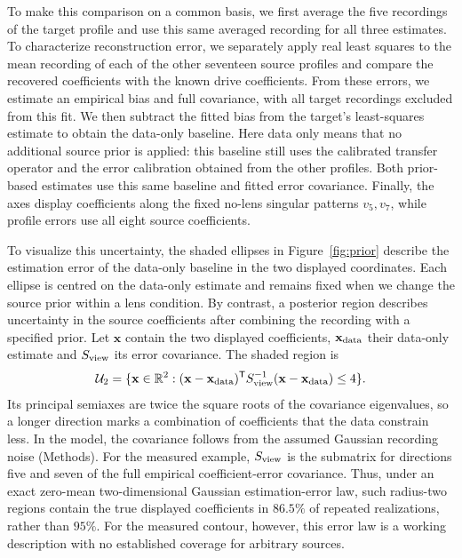 \documentclass[lineno,pdflatex,sn-nature]{sn-jnl}%
\theoremstyle{thmstyleone}%
\theoremstyle{thmstyletwo}%
\theoremstyle{thmstylethree}%
\begin{document}
To make this comparison on a common basis, we first average the five recordings of the target profile and use this same averaged recording for all three estimates. To characterize reconstruction error, we separately apply real least squares to the mean recording of each of the other seventeen source profiles and compare the recovered coefficients with the known drive coefficients. From these errors, we estimate an empirical bias and full covariance, with all target recordings excluded from this fit. We then subtract the fitted bias from the target's least-squares estimate to obtain the data-only baseline. Here data only means that no additional source prior is applied: this baseline still uses the calibrated transfer operator and the error calibration obtained from the other profiles. Both prior-based estimates use this same baseline and fitted error covariance. Finally, the axes display coefficients along the fixed no-lens singular patterns $v_5,v_7$, while profile errors use all eight source coefficients.


\begin{samepage}
To visualize this uncertainty, the shaded ellipses in Figure~\ref{fig:prior} describe the estimation error of the data-only baseline in the two displayed coordinates. Each ellipse is centred on the data-only estimate and remains fixed when we change the source prior within a lens condition. By contrast, a posterior region describes uncertainty in the source coefficients after combining the recording with a specified prior. Let $\mathbf x$ contain the two displayed coefficients, $\mathbf x_{\rm data}$ their data-only estimate and $S_{\rm view}$ its error covariance. The shaded region is
\begin{equation}
 \label{eq:uncertainty}
 \mathcal U_2=\{\mathbf x\in\mathbb R^2:(\mathbf x-\mathbf x_{\rm data})^{\mathsf T}S_{\rm view}^{-1}(\mathbf x-\mathbf x_{\rm data})\le4\}.
\end{equation}
Its principal semiaxes are twice the square roots of the covariance eigenvalues, so a longer direction marks a combination of coefficients that the data constrain less. In the model, the covariance follows from the assumed Gaussian recording noise (Methods). For the measured example, $S_{\rm view}$ is the submatrix for directions five and seven of the full empirical coefficient-error covariance. Thus, under an exact zero-mean two-dimensional Gaussian estimation-error law, such radius-two regions contain the true displayed coefficients in $86.5\%$ of repeated realizations, rather than $95\%$. For the measured contour, however, this error law is a working description with no established coverage for arbitrary sources.
\end{samepage}
\end{document}
